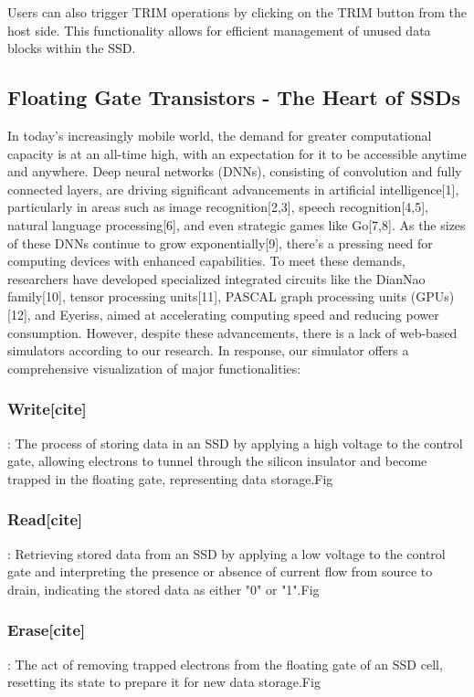 \documentclass[conference]{IEEEtran}
\begin{document}
Users can also trigger TRIM operations by clicking on the TRIM button from the host side. This functionality allows for efficient management of unused data blocks within the SSD.

\subsection{Floating Gate Transistors - The Heart of SSDs}
In today’s increasingly mobile world, the demand for greater computational capacity is at an all-time high, with an expectation for it to be accessible anytime and anywhere. Deep neural networks (DNNs), consisting of convolution and fully connected layers, are driving significant advancements in artificial intelligence[1], particularly in areas such as image recognition[2,3], speech recognition[4,5], natural language processing[6], and even strategic games like Go[7,8]. As the sizes of these DNNs continue to grow exponentially[9], there's a pressing need for computing devices with enhanced capabilities. To meet these demands, researchers have developed specialized integrated circuits like the DianNao family[10], tensor processing units[11], PASCAL graph processing units (GPUs)[12], and Eyeriss, aimed at accelerating computing speed and reducing power consumption. However, despite these advancements, there is a lack of web-based simulators according to our research. In response, our simulator offers a comprehensive visualization of major functionalities:

\subsubsection{Write[cite]}: The process of storing data in an SSD by applying a high voltage to the control gate, allowing electrons to tunnel through the silicon insulator and become trapped in the floating gate, representing data storage.Fig

\subsubsection{Read[cite]}: Retrieving stored data from an SSD by applying a low voltage to the control gate and interpreting the presence or absence of current flow from source to drain, indicating the stored data as either "0" or "1".Fig
\subsubsection{Erase[cite]}: The act of removing trapped electrons from the floating gate of an SSD cell, resetting its state to prepare it for new data storage.Fig
\end{document}
